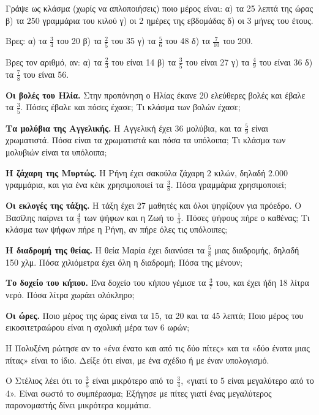 \ex Γράψε ως κλάσμα (χωρίς να απλοποιήσεις) ποιο μέρος είναι: α) τα 25 λεπτά της ώρας \quad β) τα 250 γραμμάρια του κιλού \quad γ) οι 2 ημέρες της εβδομάδας \quad δ) οι 3 μήνες του έτους.

\ex Βρες: α) τα $\frac{3}{4}$ του 20 \quad β) τα $\frac{2}{5}$ του 35 \quad γ) τα $\frac{5}{6}$ του 48 \quad δ) τα $\frac{7}{10}$ του 200.

\ex Βρες τον αριθμό, αν: α) τα $\frac{2}{3}$ του είναι 14 \quad β) τα $\frac{3}{5}$ του είναι 27 \quad γ) τα $\frac{4}{9}$ του είναι 36 \quad δ) τα $\frac{7}{8}$ του είναι 56.


\ex \textbf{Οι βολές του Ηλία.} Στην προπόνηση ο Ηλίας έκανε 20 ελεύθερες βολές και έβαλε τα $\frac{3}{5}$. Πόσες έβαλε και πόσες έχασε; Τι κλάσμα των βολών έχασε;

\ex \textbf{Τα μολύβια της Αγγελικής.} Η Αγγελική έχει 36 μολύβια, και τα $\frac{5}{9}$ είναι χρωματιστά. Πόσα είναι τα χρωματιστά και πόσα τα υπόλοιπα; Τι κλάσμα των μολυβιών είναι τα υπόλοιπα;

\ex \textbf{Η ζάχαρη της Μυρτώς.} Η Ρήνη έχει σακούλα ζάχαρη 2 κιλών, δηλαδή 2.000 γραμμάρια, και για ένα κέικ χρησιμοποιεί τα $\frac{3}{8}$. Πόσα γραμμάρια χρησιμοποιεί;

\ex \textbf{Οι εκλογές της τάξης.} Η τάξη έχει 27 μαθητές και όλοι ψηφίζουν για πρόεδρο. Ο Βασίλης παίρνει τα $\frac{4}{9}$ των ψήφων και η Ζωή το $\frac{1}{3}$. Πόσες ψήφους πήρε ο καθένας; Τι κλάσμα των ψήφων πήρε η Ρήνη, αν πήρε όλες τις υπόλοιπες;

\ex \textbf{Η διαδρομή της θείας.} Η θεία Μαρία έχει διανύσει τα $\frac{5}{8}$ μιας διαδρομής, δηλαδή 150 χλμ. Πόσα χιλιόμετρα έχει όλη η διαδρομή; Πόσα της μένουν;

\ex \textbf{Το δοχείο του κήπου.} Ένα δοχείο του κήπου γέμισε τα $\frac{3}{7}$ του, και έχει ήδη 18 λίτρα νερό. Πόσα λίτρα χωράει ολόκληρο;

\ex \textbf{Οι ώρες.} Ποιο μέρος της ώρας είναι τα 15, τα 20 και τα 45 λεπτά; Ποιο μέρος του εικοσιτετραώρου είναι η σχολική μέρα των 6 ωρών;


\ex Η Πολυξένη ρώτησε αν το «ένα ένατο και από τις δύο πίτες» και τα «δύο ένατα μιας πίτας» είναι το ίδιο. Δείξε ότι είναι, με ένα σχέδιο ή με έναν υπολογισμό.

\ex Ο Στέλιος λέει ότι το $\frac{3}{5}$ είναι μικρότερο από το $\frac{3}{4}$, «γιατί το 5 είναι μεγαλύτερο από το 4». Είναι σωστό το συμπέρασμα; Εξήγησε με πίτες γιατί ένας μεγαλύτερος παρονομαστής δίνει μικρότερα κομμάτια.

